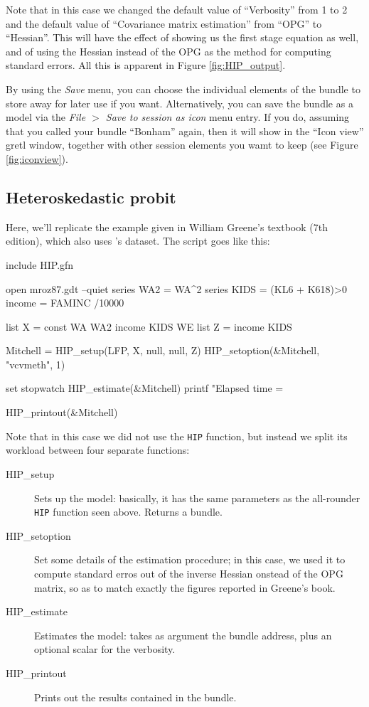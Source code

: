 \documentclass[a4paper,10pt]{article}
\newcounter{script}[section]
\begin{document}
Note that in this case we changed the default value of ``Verbosity''
from 1 to 2 and the default value of ``Covariance matrix estimation''
from ``OPG'' to ``Hessian''. 
%
%
This will have the effect of showing us the first stage
equation as well, and of using the Hessian instead of the OPG as the
method for computing standard errors. All this is apparent in Figure
\ref{fig:HIP_output}.

By using the \emph{Save} menu, you can choose the individual
elements of the bundle to store away for later use if you
want. Alternatively, you can save the bundle as a model via the
\emph{File $>$ Save to session as icon} menu entry. If you do, assuming
that you called your bundle ``Bonham'' again, then it will show in the
``Icon view'' gretl window, together with other session elements you
wamt to keep (see Figure \ref{fig:iconview}).

\subsection{Heteroskedastic probit}

Here, we'll replicate the example given in William Greene's textbook
(7th edition), which also uses \citeauthor{Mroz87}'s dataset. The
script goes like this:

\begin{code}
include HIP.gfn

open mroz87.gdt --quiet
series WA2 = WA^2
series KIDS = (KL6 + K618)>0
income = FAMINC /10000

list X = const WA WA2 income KIDS WE
list Z = income KIDS

Mitchell = HIP_setup(LFP, X, null, null, Z)
HIP_setoption(&Mitchell, "vcvmeth", 1)
 
set stopwatch
HIP_estimate(&Mitchell)
printf "Elapsed time = %

HIP_printout(&Mitchell)
\end{code}

Note that in this case we did not use the \texttt{HIP} function, but
instead we split its workload between four separate functions:
\begin{description}
\item[HIP\_setup] Sets up the model: basically, it has the same
  parameters as the all-rounder \texttt{HIP} function seen
  above. Returns a bundle.
\item[HIP\_setoption] Set some details of the estimation procedure; in
  this case, we used it to compute standard erros out of the inverse
  Hessian onstead of the OPG matrix, so as to match exactly the
  figures reported in Greene's book.
\item[HIP\_estimate] Estimates the model: takes as argument the bundle
  address, plus an optional scalar for the verbosity.
\item[HIP\_printout] Prints out the results contained in the bundle.
\end{description}
\end{document}
